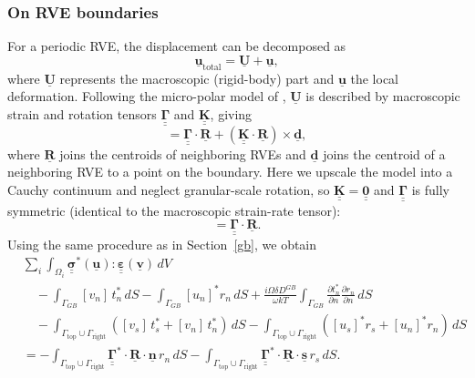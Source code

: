 \documentclass[12pt]{article}
\newcommand{\tensor}[1]{\underline{\underline{\boldsymbol{#1}}}}
\newcommand{\vect}[1]{\underline{\boldsymbol{#1}}}
\begin{document}
\subsubsection{On RVE boundaries}
For a periodic RVE, the displacement can be decomposed as
\begin{equation}
    \vect{u}_{\text{total}} = \vect{U} + \vect{u},
\end{equation}
where $\vect{U}$ represents the macroscopic (rigid-body) part and $\vect{u}$ the local deformation.  
Following the micro-polar model of \citet{rudge_micropolar_2021, rudge_viscoelastic_2025}, $\vect{U}$ is described by macroscopic strain and rotation tensors $\tensor{\Gamma}$ and $\tensor{K}$, giving
\begin{equation}
    [\vect{U}] = \tensor{\Gamma}\cdot\vect{R} + (\tensor{K}\cdot\vect{R})\times\vect{d},
\end{equation}
where $\vect{R}$ joins the centroids of neighboring RVEs and $\vect{d}$ joins the centroid of a neighboring RVE to a point on the boundary.  
Here we upscale the model into a Cauchy continuum and neglect granular-scale rotation, so $\tensor{K} = \tensor{0}$ and $\tensor{\Gamma}$ is fully symmetric (identical to the macroscopic strain-rate tensor):
\begin{equation}
    [\vect{U}] = \tensor{\Gamma}\cdot\vect{R}.
\end{equation}
Using the same procedure as in Section~\ref{gb}, we obtain
\begin{equation}
\begin{aligned}
&\sum_i \int_{\Omega_i} \tensor{\sigma}^*(\vect{u}) : \tensor{\varepsilon}(\vect{v})\, dV \\
&\quad - \int_{\Gamma_{GB}} [v_n]\, t_n^*\, dS 
-\int_{\Gamma_{GB}} [u_n]^* r_n\, dS 
+ \frac{i\Omega\delta D^{GB}}{\omega kT}\int_{\Gamma_{GB}}\frac{\partial t_n^*}{\partial n}\frac{\partial r_n}{\partial n} \, dS \\
&\quad - \int_{\Gamma_\text{top}\cup\Gamma_\text{right}} ([v_s]\, t_s^* + [v_n]\, t_n^*)\, dS
- \int_{\Gamma_\text{top}\cup\Gamma_\text{right}} ([u_s]^* r_s + [u_n]^* r_n)\, dS \\
&= -\int_{\Gamma_\text{top}\cup\Gamma_\text{right}} \tensor{\Gamma}^*\cdot\vect{R}\cdot\vect{n}\, r_n\, dS
   -\int_{\Gamma_\text{top}\cup\Gamma_\text{right}} \tensor{\Gamma}^*\cdot\vect{R}\cdot\vect{s}\, r_s\, dS.
\end{aligned}
\end{equation}


\newpage
\end{document}
